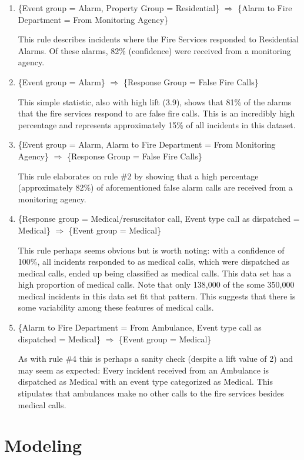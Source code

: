 \documentclass[12pt,letterpaper, oneside]
{article}
\begin{document}
\begin{enumerate}

\item \textsf{\{Event group = Alarm, Property Group = Residential\} $\Rightarrow$ \{Alarm to Fire Department = From Monitoring Agency\}}

This rule describes incidents where the Fire Services responded to Residential Alarms. Of these alarms, 82\% (confidence) were received from a monitoring agency. 
\item \textsf{\{Event group = Alarm\} $\Rightarrow$ \{Response Group = False Fire Calls\}}

This simple statistic, also with high lift (3.9), shows that 81\% of the alarms that the fire services respond to are false fire calls. This is an incredibly high percentage and represents approximately 15\% of all incidents in this dataset. 
\item \textsf{\{Event group = Alarm, Alarm to Fire Department = From Monitoring Agency\} $\Rightarrow$ \{Response Group = False Fire Calls\}}

This rule elaborates on rule \#2 by showing that a high percentage (approximately 82\%) of aforementioned false alarm calls are received from a monitoring agency.
\item \textsf{\{Response group = Medical/resuscitator call, Event type call as dispatched = Medical\} $\Rightarrow$ \{Event group = Medical\}}

This rule perhaps seems obvious but is worth noting: with a confidence of 100\%, all incidents responded to as medical calls, which were dispatched as medical calls, ended up being classified as medical calls. This data set has a high proportion of medical calls. Note that only 138,000 of the some 350,000 medical incidents in this data set fit that pattern. This suggests that there is some variability among these features of medical calls.
\item \textsf{\{Alarm to Fire Department = From Ambulance, Event type call as dispatched = Medical\} $\Rightarrow$ \{Event group = Medical\}}

As with rule \#4 this is perhaps a sanity check (despite a lift value of 2) and may seem as expected: Every incident received from an Ambulance is dispatched as Medical with an event type categorized as Medical. This stipulates that ambulances make no other calls to the fire services besides medical calls. 
\end{enumerate}

\section{Modeling}
\end{document}
